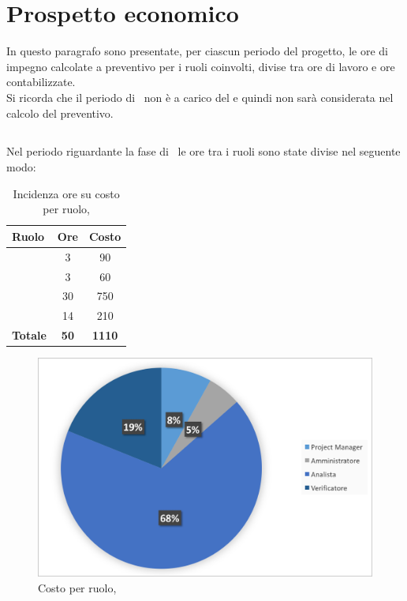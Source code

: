 \newpage
\section{Prospetto economico}
In questo paragrafo sono presentate, per ciascun periodo del progetto, le ore di impegno calcolate a preventivo per i ruoli coinvolti, divise tra ore di lavoro e ore contabilizzate.\\
 Si ricorda che il periodo di \ARM\ non è a carico del  e quindi non sarà considerata nel calcolo del preventivo.
 
\subsection{\ARD}
Nel periodo riguardante la fase di \ARD\ le ore tra i ruoli sono state divise nel seguente modo:

\begin{table}[h]
	\begin{center}
		\begin{tabular}{|l|c|c|}
			\hline
			\textbf{Ruolo}	& \textbf{Ore} & \textbf{Costo} \\
			\hline
			\textit{\Pm} &	3	&	90\\
			\hline
			\textit{\Am}	&	3	&	 60	\\
			\hline
			\textit{\An}	&	30	&	 750	\\
			\hline
			\textit{\Ver}	 & 14	&	 210	\\
			\hline
			\textbf{Totale} &	 \textbf{50}	&	\textbf{1110}\\
			\hline
		\end{tabular}
	\end{center}
	\caption{Incidenza ore su costo per ruolo, \ARD}
\end{table}

\begin{figure}[H]
	\centering 
	\includegraphics[scale=0.7]{Immagini/GraficiTorteSezione6/ARD.png}
	\caption{Costo per ruolo, \ARD}
\end{figure}

